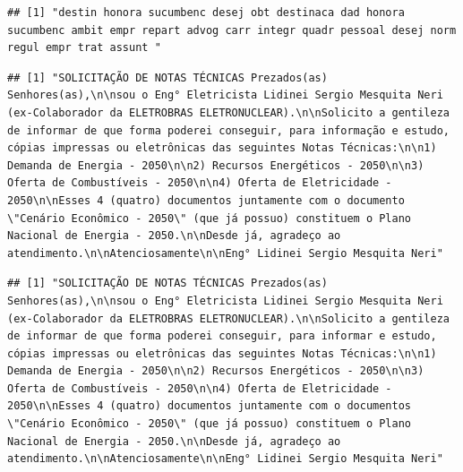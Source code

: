 \documentclass[]{article}
\newenvironment{Shaded}{\begin{snugshade}}{\end{snugshade}}
\newcommand{\DecValTok}[1]{\textcolor[rgb]{0.00,0.00,0.81}{#1}}
\newcommand{\KeywordTok}[1]{\textcolor[rgb]{0.13,0.29,0.53}{\textbf{#1}}}
\newcommand{\NormalTok}[1]{#1}
\newcommand{\OperatorTok}[1]{\textcolor[rgb]{0.81,0.36,0.00}{\textbf{#1}}}
\begin{document}
\begin{verbatim}
## [1] "destin honora sucumbenc desej obt destinaca dad honora sucumbenc ambit empr repart advog carr integr quadr pessoal desej norm regul empr trat assunt "
\end{verbatim}

\begin{Shaded}
\end{Shaded}

\begin{verbatim}
## [1] "SOLICITAÇÃO DE NOTAS TÉCNICAS Prezados(as) Senhores(as),\n\nsou o Eng° Eletricista Lidinei Sergio Mesquita Neri (ex-Colaborador da ELETROBRAS ELETRONUCLEAR).\n\nSolicito a gentileza de informar de que forma poderei conseguir, para informação e estudo, cópias impressas ou eletrônicas das seguintes Notas Técnicas:\n\n1) Demanda de Energia - 2050\n\n2) Recursos Energéticos - 2050\n\n3) Oferta de Combustíveis - 2050\n\n4) Oferta de Eletricidade - 2050\n\nEsses 4 (quatro) documentos juntamente com o documento \"Cenário Econômico - 2050\" (que já possuo) constituem o Plano Nacional de Energia - 2050.\n\nDesde já, agradeço ao atendimento.\n\nAtenciosamente\n\nEng° Lidinei Sergio Mesquita Neri"
\end{verbatim}

\begin{Shaded}
\end{Shaded}

\begin{verbatim}
## [1] "SOLICITAÇÃO DE NOTAS TÉCNICAS Prezados(as) Senhores(as),\n\nsou o Eng° Eletricista Lidinei Sergio Mesquita Neri (ex-Colaborador da ELETROBRAS ELETRONUCLEAR).\n\nSolicito a gentileza de informar de que forma poderei conseguir, para informar e estudo, cópias impressas ou eletrônicas das seguintes Notas Técnicas:\n\n1) Demanda de Energia - 2050\n\n2) Recursos Energéticos - 2050\n\n3) Oferta de Combustíveis - 2050\n\n4) Oferta de Eletricidade - 2050\n\nEsses 4 (quatro) documentos juntamente com o documentos \"Cenário Econômico - 2050\" (que já possuo) constituem o Plano Nacional de Energia - 2050.\n\nDesde já, agradeço ao atendimento.\n\nAtenciosamente\n\nEng° Lidinei Sergio Mesquita Neri"
\end{verbatim}
\end{document}
